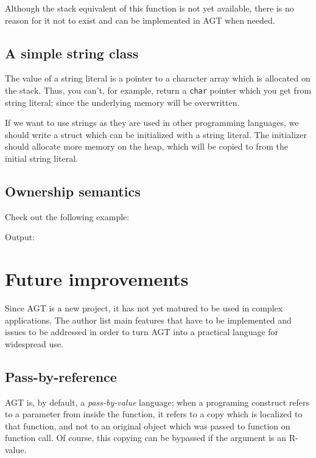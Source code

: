\documentclass[times, utf8, diplomski]{fer}
\theoremstyle{definition}
\newcommand{\textcode}[3]{
    
}
\begin{document}
Although the stack equivalent of this function is not yet available, there
is no reason for it not to exist and can be implemented in AGT when needed.

\section{A simple string class}

The value of a string literal is a pointer to a character array
which is allocated on the stack. Thus, you can't, for example, return
a \texttt{char} pointer which you get from string literal;
since the underlying memory will be overwritten.

If we want to use strings as they are used in other programming languages,
we should write a struct which can be initialized with a string literal.
The initializer should allocate more memory on the heap,
which will be copied to from the initial string literal.

\textcode{\resdir/programs/string_mgmt.agt}{string_cl}{String class}
\textcode{\resdir/programs/string_mgmt.out}{string_cl_out}{String class - output}

\section{Ownership semantics}

Check out the following example:
\textcode{\resdir/programs/shared_pointer.agt}{}{a}

Output:
\textcode{\resdir/programs/shared_pointer.out}{}{a}


\chapter{Future improvements}\label{chap:improv}

Since AGT is a new project, it has not yet matured to be used in complex applications.
The author list main features that have to be implemented and issues to be addressed
in order to turn AGT into a practical language for widespread use.

\section{Pass-by-reference}

AGT is, by default, a \textit{pass-by-value} language; when a programing construct 
refers to a parameter from inside the function, it refers to a copy which is localized to that function,
and not to an original object which was passed to function on function call.
Of course, this copying can be bypassed if the argument is an R-value.
\end{document}
